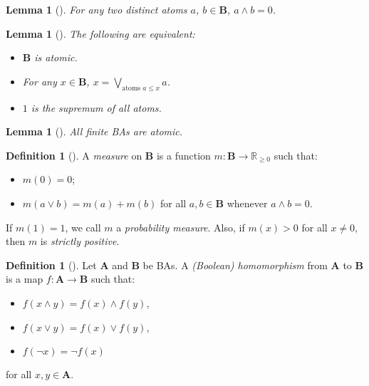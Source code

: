 \documentclass{article}
\newtheorem{lemma}[theorem]{Lemma}
\theoremstyle{definition}
\newtheorem{definition}[theorem]{Definition}
\theoremstyle{remark}
\begin{document}
\begin{lemma}[\cite{ganesh2006introduction}]
  For any two distinct atoms $a$, $b \in \mathbf{B}$, $a \land b = 0$.
\end{lemma}

\begin{lemma}[\cite{givant2008introduction}] \label{thm:representation}
  The following are equivalent:
  \begin{itemize}
  \item $\mathbf{B}$ is atomic.
  \item For any $x \in \mathbf{B}$, $x = \bigvee_{\text{atoms } a \le x} a$.
  \item $1$ is the supremum of all atoms.
  \end{itemize}
\end{lemma}

\begin{lemma}[\cite{givant2008introduction}] \label{lemma:atomic}
  All finite BAs are atomic.
\end{lemma}

\begin{definition}[\cite{gaifman1964concerning,DBLP:books/daglib/0090259}] \label{def:measure}
  A \emph{measure} on $\mathbf{B}$ is a function $m\colon
  \mathbf{B} \to \mathbb{R}_{\ge 0}$ such that:
  \begin{itemize}
  \item $m(0) = 0$;
  \item $m(a \lor b) = m(a) + m(b)$ for all $a, b \in \mathbf{B}$ whenever $a
    \land b = 0$.
  \end{itemize}
  If $m(1) = 1$, we call $m$ a \emph{probability measure}. Also, if $m(x) > 0$
  for all $x \ne 0$, then $m$ is \emph{strictly positive}.
\end{definition}

\begin{definition}[\cite{givant2008introduction}]
  Let $\mathbf{A}$ and $\mathbf{B}$ be BAs. A \emph{(Boolean) homomorphism} from
  $\mathbf{A}$ to $\mathbf{B}$ is a map $f\colon \mathbf{A} \to \mathbf{B}$ such
  that:
  \begin{itemize}
  \item $f(x \land y) = f(x) \land f(y)$,
  \item $f(x \lor y) = f(x) \lor f(y)$,
  \item $f(\neg x) = \neg f(x)$
  \end{itemize}
  for all $x, y \in \mathbf{A}$.
\end{definition}
\end{document}
